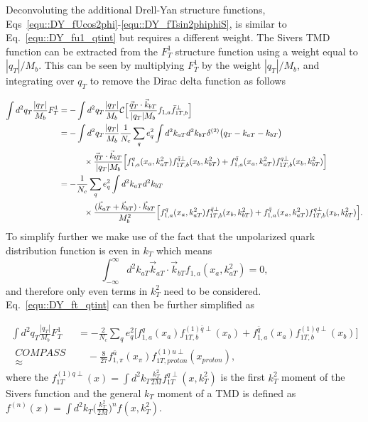 Deconvoluting the additional Drell-Yan structure functions,
Eqs~\ref{equ::DY_fUcos2phi}-\ref{equ::DY_fTsin2phiphiS}, is similar to
Eq.~\ref{equ::DY_fu1_qtint} but requires a different weight.  The Sivers TMD
function can be extracted from the $F_T^1$ structure function using a weight
equal to $|q_T|/M_b$.  This can be seen by multiplying $F_T^1$ by the weight
$|q_T|/M_b$, and integrating over $q_T$ to remove the Dirac delta function as
follows

\begin{align}
  \label{equ::DY_ft_qtint}
  \int d^2{q_T} \frac{|q_T|}{M_b} F_T^1 &=
  - \int d^2{q_T} \frac{|q_T|}{M_b} {\cal C}
  \Big[\frac{\vec{q}_T \cdot \vec{k}_{bT}} {|q_T|M_{b}}  
  f_{1,a}  \bar{f}_{1T,b}^{\perp} \Big]
  \\ \nonumber
  &= - \int d^2{q_T} \frac{|q_T|}{M_b}
  \frac{1}{N_c} \sum_q e_q^2 \int d^2 k_{aT} d^2 k_{bT} 
  \delta^{(2)}\bigl(q_T - k_{aT} - k_{bT} \bigr)
  \\ \nonumber
  & \quad\quad\quad
  \times \frac{\vec{q}_T \cdot \vec{k}_{bT}} {|q_T|M_{b}}
  \Big[ f_{1,a}^q(x_a,k_{aT}^2)f_{1T,b}^{\bar{q}\perp}(x_b,k_{bT}^2) +
    f_{1,a}^{\bar{q}}(x_a,k_{aT}^2)f_{1T,b}^{q\perp}(x_b,k_{bT}^2) \Big]
  \\ \nonumber
  &= - \frac{1}{N_c} \sum_q e_q^2 \int d^2 k_{aT} d^2 k_{bT} 
  \\ \nonumber
  & \quad\quad\quad
  \times \frac{(\vec{k}_{aT} + \vec{k}_{bT}) \cdot \vec{k}_{bT}} {M^2_{b}}
  \Big[ f_{1,a}^q(x_a,k_{aT}^2)f_{1T,b}^{\bar{q}\perp}(x_b,k_{bT}^2) +
    f_{1,a}^{\bar{q}}(x_a,k_{aT}^2)f_{1T,b}^{q\perp}(x_b,k_{bT}^2) \Big].
\end{align}
\noindent
To simplify further we make use of the fact that the unpolarized quark
distribution function is even in $k_T$ which means
\begin{equation}
  \int_{-\infty}^{\infty} d^2 k_{aT} \vec{k}_{aT} \cdot \vec{k}_{bT}
  f_{1,a}(x_a, k_{aT}^2) = 0,
\end{equation}
\noindent
and therefore only even terms in $k_T^2$ need to be
considered. Eq.~\ref{equ::DY_ft_qtint} can then be further simplified as

\begin{align}
  \int d^2{q_T} \frac{|q_T|}{M_b} F_T^1 &=
  - \frac{2}{N_c} \sum_q e_q^2
  \Big[ f_{1,a}^q(x_a) f_{1T,b}^{(1)\bar{q}\perp}(x_b) +
    f_{1,a}^{\bar{q}}(x_a) f_{1T,b}^{(1)q\perp}(x_b) \Big]
  \\ \nonumber
  \substack{COMPASS \\ \approx}& \quad
  - \frac{8}{27}
  f_{1,\pi}^{\bar{u}}(x_\pi)f_{1T,proton}^{(1)u\perp}(x_{proton}),
\end{align}
\noindent
where the $f_{1T}^{(1)q\perp}(x) = \int d^2 k_{T}
\frac{k_T^2}{2M}f_{1T}^{q\perp}(x, k_T^2)$ is the first $k_T^2$ moment of the
Sivers function and the general $k_T$ moment of a TMD is defined as $f^{(n)}(x)
= \int d^2 k_{T} \Big(\frac{k_T^2}{2M}\Big)^nf(x, k_T^2)$.

